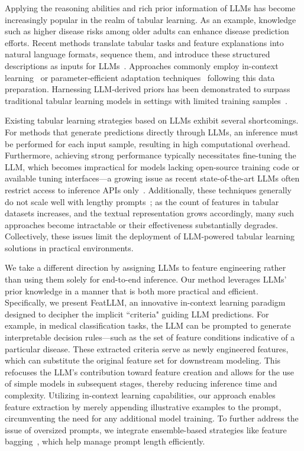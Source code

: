 Applying the reasoning abilities and rich prior information of LLMs has become increasingly popular in the realm of tabular learning. As an example, knowledge such as higher disease risks among older adults can enhance disease prediction efforts. Recent methods translate tabular tasks and feature explanations into natural language formats, sequence them, and introduce these structured descriptions as inputs for LLMs~\cite{dinh2022lift,wang2023anypredict}. Approaches commonly employ in-context learning~\cite{nam2023semi} or parameter-efficient adaptation techniques~\cite{dinh2022lift,hegselmann2023tabllm} following this data preparation. Harnessing LLM-derived priors has been demonstrated to surpass traditional tabular learning models in settings with limited training samples~\cite{hegselmann2023tabllm}.

Existing tabular learning strategies based on LLMs exhibit several shortcomings. For methods that generate predictions directly through LLMs, an inference must be performed for each input sample, resulting in high computational overhead. Furthermore, achieving strong performance typically necessitates fine-tuning the LLM, which becomes impractical for models lacking open-source training code or available tuning interfaces—a growing issue as recent state-of-the-art LLMs often restrict access to inference APIs only~\cite{anil2023palm,openai2023gpt4}. Additionally, these techniques generally do not scale well with lengthy prompts~\cite{liu2023lost}; as the count of features in tabular datasets increases, and the textual representation grows accordingly, many such approaches become intractable or their effectiveness substantially degrades. Collectively, these issues limit the deployment of LLM-powered tabular learning solutions in practical environments.

We take a different direction by assigning LLMs to feature engineering rather than using them solely for end-to-end inference. Our method leverages LLMs' prior knowledge in a manner that is both more practical and efficient. Specifically, we present \textsf{FeatLLM}, an innovative in-context learning paradigm designed to decipher the implicit ``criteria" guiding LLM predictions. For example, in medical classification tasks, the LLM can be prompted to generate interpretable decision rules—such as the set of feature conditions indicative of a particular disease. These extracted criteria serve as newly engineered features, which can substitute the original feature set for downstream modeling. This refocuses the LLM’s contribution toward feature creation and allows for the use of simple models in subsequent stages, thereby reducing inference time and complexity. Utilizing in-context learning capabilities, our approach enables feature extraction by merely appending illustrative examples to the prompt, circumventing the need for any additional model training. To further address the issue of oversized prompts, we integrate ensemble-based strategies like feature bagging~\cite{breiman2001random}, which help manage prompt length efficiently.

